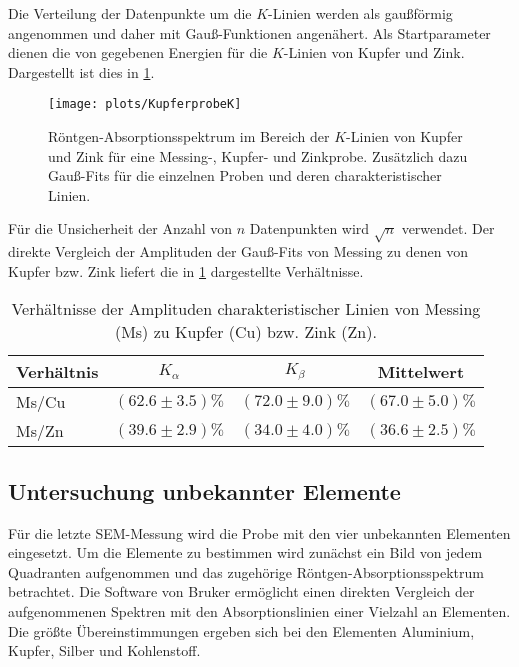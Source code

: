 	Die Verteilung der Datenpunkte um die $K$-Linien werden als gaußförmig angenommen und daher mit Gauß-Funktionen angenähert.
	Als Startparameter dienen die von \cite{brukerPTE} gegebenen Energien für die $K$-Linien von Kupfer und Zink.
	Dargestellt ist dies in \cref{fig:k-linien}.
	\begin{figure}[ht]
		\centering
		\texttt{[image: plots/KupferprobeK]}
		\caption{Röntgen-Absorptionsspektrum im Bereich der $K$-Linien von Kupfer und Zink für eine Messing-, Kupfer- und Zinkprobe. Zusätzlich dazu Gauß-Fits für die einzelnen Proben und deren charakteristischer Linien.}
		\label{fig:k-linien}
	\end{figure}
	Für die Unsicherheit der Anzahl von $n$ Datenpunkten wird $\sqrt{n}$ verwendet.
	Der direkte Vergleich der Amplituden der Gauß-Fits von Messing zu denen von Kupfer bzw. Zink liefert die in \cref{tab:amplituden} dargestellte Verhältnisse.
	\begin{table}[H]
		\centering
		\caption{Verhältnisse der Amplituden charakteristischer Linien von Messing (Ms) zu Kupfer (Cu) bzw. Zink (Zn).}
		\begin{tabular}{l|c|c|c}
			Verhältnis & $K_\alpha$ & $K_\beta$ & Mittelwert \\ \hline
			Ms/Cu & $(62.6\pm3.5)\%$ & $(72.0\pm9.0)\%$ & $(67.0\pm5.0)\%$ \\
			Ms/Zn & $(39.6\pm2.9)\%$ & $(34.0\pm4.0)\%$ & $(36.6\pm2.5)\%$ \\
		\end{tabular}
		\label{tab:amplituden}
	\end{table}

\subsection{Untersuchung unbekannter Elemente}

	Für die letzte SEM-Messung wird die Probe mit den vier unbekannten Elementen eingesetzt.
	Um die Elemente zu bestimmen wird zunächst ein Bild von jedem Quadranten aufgenommen und das zugehörige Röntgen-Absorptionsspektrum betrachtet.
	Die Software von Bruker ermöglicht einen direkten Vergleich der aufgenommenen Spektren mit den Absorptionslinien einer Vielzahl an Elementen.
	Die größte Übereinstimmungen ergeben sich bei den Elementen Aluminium, Kupfer, Silber und Kohlenstoff.

